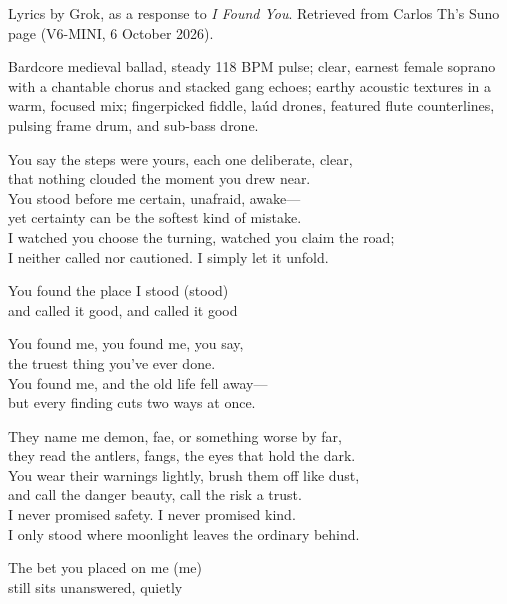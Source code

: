 
\begin{notes}
Lyrics by Grok, as a response to \emph{I Found You}. Retrieved from Carlos Th's Suno page (V6-MINI, 6 October 2026).
\end{notes}
\begin{style}
Bardcore medieval ballad, steady 118 BPM pulse; clear, earnest female soprano with a chantable chorus and stacked gang echoes; earthy acoustic textures in a warm, focused mix; fingerpicked fiddle, laúd drones, featured flute counterlines, pulsing frame drum, and sub-bass drone.
\end{style}
\begin{lyrics}

You say the steps were yours, each one deliberate, clear,\\
that nothing clouded the moment you drew near.\\
You stood before me certain, unafraid, awake—\\
yet certainty can be the softest kind of mistake.\\
I watched you choose the turning, watched you claim the road;\\
I neither called nor cautioned. I simply let it unfold.

You found the place I stood (stood)\\
and called it good, and called it good

You found me, you found me, you say,\\
the truest thing you’ve ever done.\\
You found me, and the old life fell away—\\
but every finding cuts two ways at once.

They name me demon, fae, or something worse by far,\\
they read the antlers, fangs, the eyes that hold the dark.\\
You wear their warnings lightly, brush them off like dust,\\
and call the danger beauty, call the risk a trust.\\
I never promised safety. I never promised kind.\\
I only stood where moonlight leaves the ordinary behind.

The bet you placed on me (me)\\
still sits unanswered, quietly


\end{lyrics}
